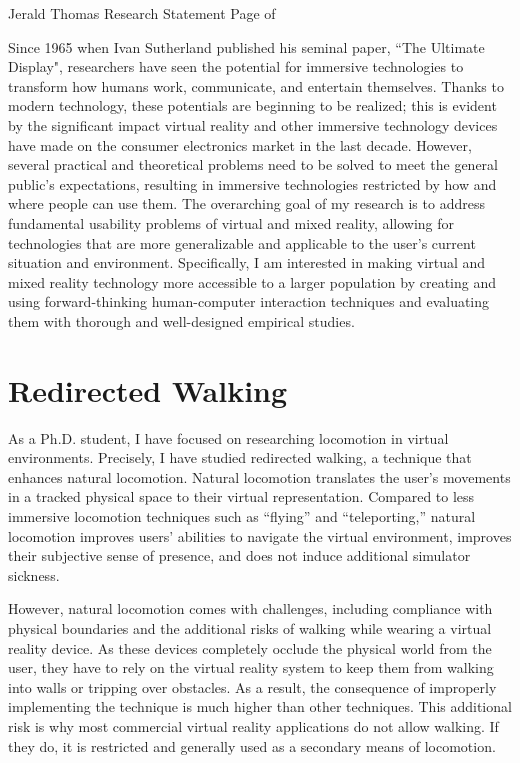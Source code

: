 \newpage

\setcounter{page}{1}
\makecvfooter
  {Jerald Thomas}
  {Research Statement}
  {Page \thepage \hspace{1pt} of \pageref{research_last}}


\makecvheader[C]
\doublespacing


Since 1965 when Ivan Sutherland published his seminal paper, ``The Ultimate Display", researchers have seen the potential for immersive technologies to transform how humans work, communicate, and entertain themselves. Thanks to modern technology, these potentials are beginning to be realized; this is evident by the significant impact virtual reality and other immersive technology devices have made on the consumer electronics market in the last decade. However, several practical and theoretical problems need to be solved to meet the general public’s expectations, resulting in immersive technologies restricted by how and where people can use them. The overarching goal of my research is to address fundamental usability problems of virtual and mixed reality, allowing for technologies that are more generalizable and applicable to the user's current situation and environment. Specifically, I am interested in making virtual and mixed reality technology more accessible to a larger population by creating and using forward-thinking human-computer interaction techniques and evaluating them with thorough and well-designed empirical studies.

\section*{Redirected Walking}
\vspace{-0.5cm}
As a Ph.D. student, I have focused on researching locomotion in virtual environments. Precisely, I have studied redirected walking, a technique that enhances natural locomotion. Natural locomotion translates the user’s movements in a tracked physical space to their virtual representation. Compared to less immersive locomotion techniques such as ``flying'' and ``teleporting,'' natural locomotion improves users' abilities to navigate the virtual environment, improves their subjective sense of presence, and does not induce additional simulator sickness.

However, natural locomotion comes with challenges, including compliance with physical boundaries and the additional risks of walking while wearing a virtual reality device. As these devices completely occlude the physical world from the user, they have to rely on the virtual reality system to keep them from walking into walls or tripping over obstacles. As a result, the consequence of improperly implementing the technique is much higher than other techniques. This additional risk is why most commercial virtual reality applications do not allow walking. If they do, it is restricted and generally used as a secondary means of locomotion.


